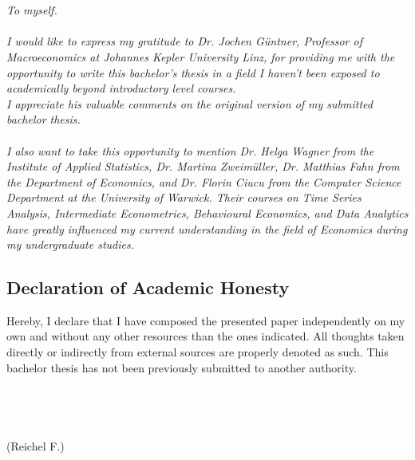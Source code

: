 

{%
	\chapter*{}

\textit{
To myself.\\ \\
I would like to express my gratitude to Dr. Jochen Güntner, Professor of Macroeconomics at Johannes Kepler University Linz, for providing me with the opportunity to write this bachelor's thesis in a field I haven't been exposed to academically beyond introductory level courses. \\
I appreciate his valuable comments on the original version of my submitted bachelor thesis.\\ \\
I also want to take this opportunity to mention Dr. Helga Wagner from the Institute of Applied Statistics, Dr. Martina Zweimüller, Dr. Matthias Fahn from the Department of Economics, and Dr. Florin Ciucu from the Computer Science Department at the University of Warwick. Their courses on Time Series Analysis, Intermediate Econometrics, Behavioural Economics, and Data Analytics have greatly influenced my current understanding in the field of Economics during my undergraduate studies.
}

\newpage

\section*{Declaration of Academic Honesty}


Hereby, I declare that I have composed the presented paper independently on my own
and without any other resources than the ones indicated. All thoughts taken directly or
indirectly from external sources are properly denoted as such.
This bachelor thesis has not been previously submitted to another authority.\\
\\ \\ \\ \\ 
(Reichel F.)



}
